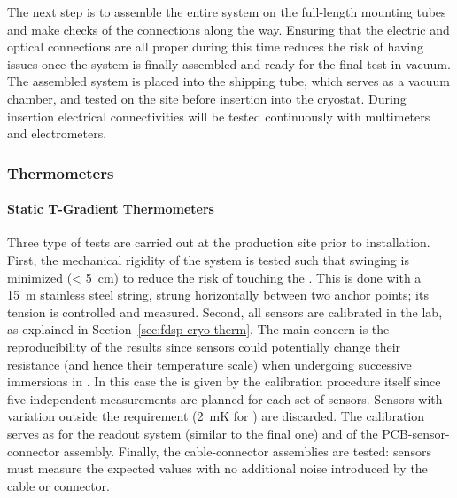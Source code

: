 The next step %
is to assemble the entire system on the full-length mounting tubes and make checks of the connections along the way.  Ensuring that the electric and optical connections are all proper during this time reduces the risk of having issues once the system is finally assembled and ready for the final test in vacuum.  %
The assembled system is placed into the shipping tube, which serves as a vacuum chamber, and tested on the  site before insertion into the    cryostat. During insertion electrical connectivities will be tested continuously with multimeters and electrometers. %



\subsubsection{Thermometers}
\label{sec:fdgen-slow-cryo-qc-th}

\paragraph{Static T-Gradient Thermometers}
\label{sec:fdgen-slow-cryo-qc-thst}

Three type of tests are carried out at the production site prior to installation. First, the mechanical rigidity of the system is tested such that swinging is minimized (< \SI{5}{cm})
to reduce the risk of touching the . This is done with a \SI{15}{m} stainless steel string, strung horizontally between two anchor points; its tension is controlled and measured. 
Second, %
all sensors are calibrated in the lab, as explained in Section~\ref{sec:fdsp-cryo-therm}.
The main concern is the reproducibility of the results since sensors could potentially change their resistance (and hence their temperature scale)
when undergoing successive immersions in \lar. In this case the  is given by the calibration procedure itself since five independent measurements
are planned for each set of sensors. Sensors with \rms variation outside the requirement (\SI{2}{mK} for ) are discarded.  
The calibration serves as  for the readout system (similar to the final one) and of the PCB-sensor-connector assembly. Finally, the cable-connector assemblies are tested: sensors must measure the expected values with no additional noise introduced by the cable or connector. 


